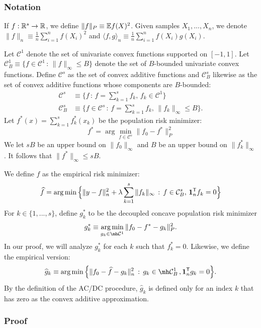  \subsubsection{Notation} 
\label{sec:false_negative_proof_notations}
If $f : \mathbb{R}^s \rightarrow {\mathbb R}$, we define $\| f \|_P \equiv {\mathbb E} f(X)^2$. 
Given samples $X_1,...,X_n$, we denote $\| f \|_n \equiv \frac{1}{n} \sum_{i=1}^n f(X_i)^2$ and $\langle f, g \rangle_n \equiv \frac{1}{n} \sum_{i=1}^n f(X_i) g(X_i)$. 

Let $\mathcal{C}^1$ denote the set of univariate convex functions supported on $[-1,1]$. Let $\mathcal{C}^1_B \equiv \{ f \in \mathcal{C}^1 \,:\, \| f \|_\infty \leq B \}$ denote the set of $B$-bounded univariate convex functions. 
Define $\mathcal{C}^s$ as the set of convex additive functions and
$\mathcal{C}^s_B$ likewise as the set of convex additive functions
whose components are $B$-bounded:
\begin{align*}
\mathcal{C}^s &\equiv \{ f \,:\, f = \sum_{k=1}^s f_k, \,
   f_k \in \mathcal{C}^1 \} \\
\mathcal{C}^s_B &\equiv \{ f \in \mathcal{C}^s \,:\, 
f = \sum_{k=1}^s f_k, \, \| f_k \|_\infty \leq B \}.
\end{align*}
Let $f^*(x) = \sum_{k=1}^s f^*_k(x_k)$ be the population risk minimizer:
\[
f^* = \arg\min_{f \in \mathcal{C}^s} \| f_0 - f^* \|_P^2
\]
We let $sB$ be an upper bound on $\| f_0 \|_\infty$ and $B$ be an
upper bound on $\| f^*_k \|_\infty$. 
It follows that $\|f^* \|_\infty \leq s B$.

We define $\hat{f}$ as the empirical risk minimizer:
\[
\widehat{f} = \arg\min \Big \{ \| y - f \|_n^2 + \lambda \sum_{k=1}^s \| f_k \|_\infty 
    \,:\, f \in \mathcal{C}^s_B,\, \mbox{\boldmath $1$}_n^{\mathsf{T}} f_k = 0 \Big \}
\]
For $k \in \{1,...,s\}$, define $g^*_k$ to be the decoupled concave population risk minimizer
\[
g^*_k \equiv \argmin_{g_k \in \mh \mathcal{C}^1} \| f_0 - f^* - g_k \|_P^2 .
\]
In our proof, we will analyze $g^*_k$ for each $k$ such that $f^*_k = 0$. Likewise, we define the empirical version:
\[
\hat{g}_k \equiv \argmin \Big\{ \| f_0 - \hat{f} - g_k \|_n^2 \,:\, g_k \in \mh \mathcal{C}^1_B \,, \mathbf{1}_n^\tran g_k = 0 \Big\}.
\]
By the definition of the AC/DC procedure, $\hat{g}_k$ is defined only
for an index $k$ that has zero as the convex additive approximation.


\subsubsection{Proof}
 
